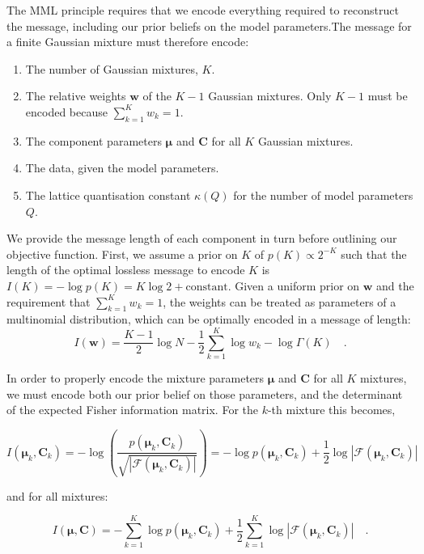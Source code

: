 \documentclass{article}
\newcommand{\vect}[1]{\boldsymbol{\mathbf{#1}}}
\def\veccov{\vect{C}}
\def\vecmean{\vect{\mu}}
\def\weight{w}
\def\weights{\vect{\weight}}
\begin{document}
The MML principle requires that we encode everything required to reconstruct
the message, including our prior beliefs on the model parameters.The message 
for a finite Gaussian mixture must therefore encode:
\begin{enumerate}
  \item The number of Gaussian mixtures, $K$.
  \item The relative weights $\weights$ of the $K - 1$ Gaussian mixtures. Only
        $K - 1$ must be encoded because $\sum_{k=1}^{K}\weight_k = 1$.
  \item The component parameters $\vecmean$ and $\veccov$ for all $K$ Gaussian
        mixtures.
  \item The data, given the model parameters.
  \item The lattice quantisation constant $\kappa(Q)$ for the number of model
        parameters $Q$.
\end{enumerate}

We provide the message length of each component in turn before outlining our
objective function.  First, we assume a prior on $K$ of $p(K) \propto 2^{-K}$
such that the length of the optimal lossless message to encode $K$ is 
$I(K) = -\log{p(K)} = K\log{2} + \textrm{constant}$.  Given a uniform prior
on $\weights$ and the requirement that $\sum_{k=1}^{K}\weight_k = 1$, the 
weights can be treated as parameters of a multinomial distribution, which can
be optimally encoded in a message of length:
\begin{equation}
  I(\weights) 
    = \frac{K - 1}{2}\log{N} 
    - \frac{1}{2}\sum_{k=1}^{K}\log\weight_k 
    - \log{\Gamma{\left(K\right)}} \quad .
\end{equation}

In order to properly encode the mixture parameters $\vecmean$ and $\veccov$
for all $K$ mixtures, we must encode both our prior belief on those parameters,
and the determinant of the expected Fisher information matrix. For the $k$-th
mixture this becomes,

\begin{equation}
  I(\vecmean_k,\veccov_k) = -\log{\left(\frac{p(\vecmean_k,\veccov_k)}{\sqrt{|\mathcal{F}\left(\vecmean_k,\veccov_k\right)|}}\right)}
                          = -\log{p(\vecmean_k,\veccov_k)} + \frac{1}{2}\log{|\mathcal{F}\left(\vecmean_k,\veccov_k\right)|}
\end{equation}

\noindent{}and for all mixtures:

\begin{equation}
  I(\vecmean,\veccov) = -\sum_{k=1}^{K}\log{p(\vecmean_k,\veccov_k)} + \frac{1}{2}\sum_{k=1}^{K}\log{|\mathcal{F}\left(\vecmean_k,\veccov_k\right)|} \quad .
  \label{eq:I_component_params}
\end{equation}
\end{document}
